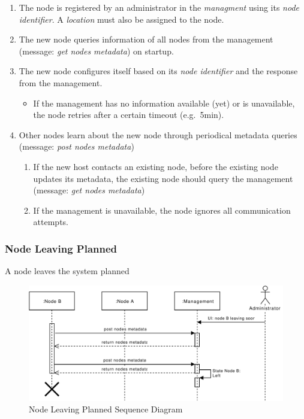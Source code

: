 \begin{enumerate}
    \item The node is registered by an administrator in the \emph{managment} using its \emph{node identifier}. A \emph{location} must also be assigned to the node. %
    \item The new node queries information of all nodes from the management (message: \emph{get nodes metadata}) on startup. 
    \item The new node configures itself based on its \emph{node identifier} and the response from the management.
        \begin{itemize}
            \item If the management has no information available (yet) or is unavailable, the node retries after a certain timeout (e.g.\ 5min).
        \end{itemize}
    \item Other nodes learn about the new node through periodical metadata queries (message: \emph{post nodes metadata}) %
        \begin{enumerate}
            \item If the new host contacts an existing node, before the existing node updates its metadata, the existing node should query the management (message: \emph{get nodes metadata})
            \item If the management is unavailable, the node ignores all communication attempts.
        \end{enumerate}
\end{enumerate}

\subsubsection{Node Leaving Planned}\label{sec:scenario-node-leave-planned}
A node leaves the system planned

\begin{figure}[h]
    \centering
    \includegraphics[width=\linewidth]{resources/node_leaving_planned.pdf}
    \caption{Node Leaving Planned Sequence Diagram}
    \label{fig:node-leave-planned}
\end{figure}

